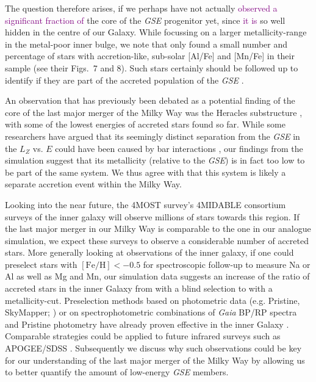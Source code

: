 \documentclass[fleqn,usenatbib]{mnras}
\newcommand{\changed}[1]{{\textcolor{purple}{#1}}}
\begin{document}
The question therefore arises, if we perhaps have not actually \changed{observed a significant fraction of} the core of the \textit{GSE} progenitor yet, since \changed{it is} so well hidden in the centre of our Galaxy. While focussing on a larger metallicity-range in the metal-poor inner bulge, we note that \citet{Lucey2022} only found a small number and percentage of stars with accretion-like, sub-solar [Al/Fe] and [Mn/Fe] in their sample (see their Figs.~7 and 8). Such stars certainly should be followed up to identify if they are part of the accreted population of the \textit{GSE} \citep[see also][]{Kunder2025}.

An observation that has previously been debated as a potential finding of the core of the last major merger of the Milky Way was the Heracles substructure \citep{Horta2021}, with some of the lowest energies of accreted stars found so far. While some researchers have argued that its seemingly distinct separation from the \textit{GSE} in the $L_Z$ vs. $E$ could have been caused by bar interactions \citep{Dillamore2025}, our findings from the simulation suggest that its metallicity (relative to the \textit{GSE}) is in fact too low to be part of the same system. We thus agree with \citet{Horta2021} that this system is likely a separate accretion event within the Milky Way.

Looking into the near future, the 4MOST survey's 4MIDABLE consortium surveys of the inner galaxy \citep{4MOST_HR_DiskBulge, 4MOST_LR_DiskBulge} will observe millions of stars towards this region. If the last major merger in our Milky Way is comparable to the one in our analogue simulation, we expect these surveys to observe a considerable number of accreted stars. More generally looking at observations of the inner galaxy, if one could preselect stars with $\mathrm{[Fe/H]} < -0.5$ for spectroscopic follow-up to measure Na or Al as well as Mg and Mn, our simulation data suggests an increase of the ratio of accreted stars in the inner Galaxy from  with a blind selection to  with a metallicity-cut. Preselection methods based on photometric data (e.g. Pristine, SkyMapper; \citealt{Starkenburg2017, DaCosta2019}) or on spectrophotometric combinations of \textit{Gaia} BP/RP spectra and Pristine photometry \citep{Martin2024} have already proven effective in the inner Galaxy \citep[e.g. with the Pristine Inner Galaxy Survey;][]{Arentsen2020, Arentsen2020b}. Comparable strategies could be applied to future infrared surveys such as APOGEE/SDSS \citep{Santana2021}. Subsequently we discuss why such observations could be key for our understanding of the last major merger of the Milky Way by allowing us to better quantify the amount of low-energy \textit{GSE} members.
\end{document}
